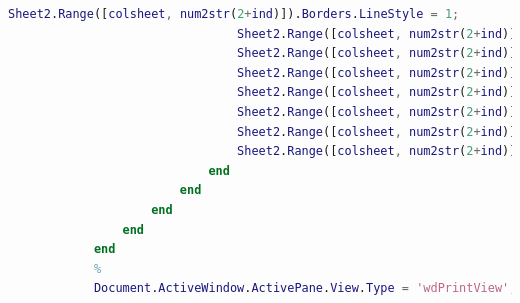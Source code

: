 \begin{lstlisting}[language=Matlab]
                                Sheet2.Range([colsheet, num2str(2+ind)]).Borders.LineStyle = 1;
                                Sheet2.Range([colsheet, num2str(2+ind)]).Borders.Weight = 3;
                                Sheet2.Range([colsheet, num2str(2+ind)]).HorizontalAlignment = 1;
                                Sheet2.Range([colsheet, num2str(2+ind)]).VerticalAlignment = 1;
                                Sheet2.Range([colsheet, num2str(2+ind)]).Font.Size = 10.5;
                                Sheet2.Range([colsheet, num2str(2+ind)]).Font.bold = 0;
                                Sheet2.Range([colsheet, num2str(2+ind)]).Font.Name = '宋体';
                                Sheet2.Range([colsheet, num2str(2+ind)]).Value = txt{indexoftopic(j), col}; %答案
                            end
                        end
                    end
                end
            end
            %
            Document.ActiveWindow.ActivePane.View.Type = 'wdPrintView';    % 设置视图方式为页面
            \end{lstlisting}
